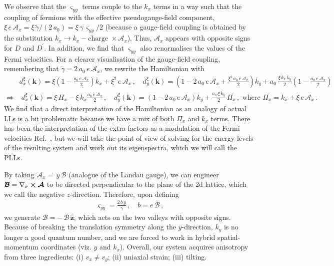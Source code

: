 \documentclass[aps,prb, onecolumn, nofootinbib, citeautoscript,10pt]{revtex4-2}
\newcommand{\red}[1]{{\color{red}#1}}
\newcommand{\bs}[1]{\boldsymbol{#1}}
\def \nn{\nonumber \\}
\begin{document}
We observe that the $\varsigma_{yy}$ terms \red{couple} to the $k_x$ terms in a way such that the coupling of fermions with the effective pseudogauge-field component, $ \xi\, e \,  \mathcal{A}_x = \xi \, \tilde \gamma /(2\, a_0) = \xi\, \gamma \, \varsigma_{yy} / 2 $ (because a gauge-field coupling is obtained by the substitution $k_x \rightarrow k_x - \text{charge } \times \mathcal{A}_x $). Thus, $ \mathcal{A}_x $ appears with opposite signs for $ D$ and $D^\prime$. In addition, we find that $\varsigma_{yy}$ also \red{renormalises} the values of the Fermi velocities. For a clearer \red{visualisation} of the gauge-field coupling, remembering that $  
\tilde \gamma  = 2\, a_0 \,e \,  \mathcal{A}_x $, we rewrite the Hamiltonian with
\begin{align}
 & d^\xi_x(\boldsymbol{k}) = \xi  \left (1 - \frac{ a_0 \,e \,  \mathcal{A}_x} {2}\right ) {k}_x 
+  \xi^2\,  e \,  \mathcal{A}_x  \,,
\quad d^\xi_y(\boldsymbol{k}) =
\left ( 1- 2\,a_0 \,e \,  \mathcal{A}_x  +  \frac{ \xi^2 \,a_0 \,e \,  \mathcal{A}_x} {2} 
\right )  k_y 
+  a_0\,\frac{ \xi\,k_x \, k_y}{2} \left (1 - \frac{ a_0 \,e \,  \mathcal{A}_x} {2}  \right ) \nn
\Rightarrow & \; d^\xi_x(\boldsymbol{k}) = \xi  \,\Pi_x
  - \xi\,k_x  \frac{ a_0 \,e \,  \mathcal{A}_x} {2} \,,
\quad d^\xi_y(\boldsymbol{k}) =
\left ( 1- 2\,a_0 \,e \,  \mathcal{A}_x \right )  k_y  
+  \frac{ a_0\,\xi \, k_y} {2} \,\Pi_x \,,
\text{ where } \Pi_x =  k_x +  \xi \,  e \,  \mathcal{A}_x \,.
\end{align}
We find that a direct interpretation of the Hamiltonian as an analogy of actual LLs is a bit problematic because we have a mix of both $\Pi_x$ and $k_x $ terms. There has been the interpretation of the extra factors as a modulation of the Fermi velocities Ref.~\cite{complex-LL-strained-graphene}, but we will take the point of view of solving for the energy levels of the resulting system and work out its eigenspectra, which we will call the PLLs.


By taking $\mathcal{A}_x = \, y\, {\mathcal B} $ (analogue of the Landau gauge), we can engineer $\bs{\mathcal B}= \nabla_{\bs r} \cross \bs{\mathcal A }$ to be directed perpendicular to the plane of the 2d lattice, which we call the negative $z$-direction. Therefore, \red{upon defining}
\begin{align}
 \varsigma_{yy} = \frac{2 \, b\, y} {\gamma} \,, \quad
b = e\, \mathcal B\,,
\end{align}
we generate $ \bs{\mathcal B} = -\,{\mathcal B} \, \bs{\hat z}$, which acts on the two valleys with opposite signs. Because of breaking the translation symmetry along the $y$-direction, $k_y $ is no longer a good quantum number, and we are forced to work in \red{hybrid} spatial-momentum coordinates (viz. $y$ and $k_x$). Overall, our system acquires anisotropy from three ingredients: (i) $ v_x \neq v_y$; (ii) uniaxial strain; (iii) tilting. 
\end{document}
